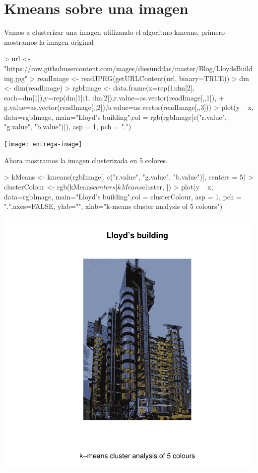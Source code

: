 \documentclass [a4paper] {article}
\begin{document}
\section{Kmeans sobre una imagen}
Vamos a clusterizar una imagen utilizando el algoritmo kmeans, primero mostramos la imagen original
\begin{center}
\begin{Schunk}
\begin{Sinput}
> url <- "https://raw.githubusercontent.com/mages/diesunddas/master/Blog/LloydsBuilding.jpg"
> readImage <- readJPEG(getURLContent(url, binary=TRUE))
> dm <- dim(readImage)
> rgbImage <- data.frame(x=rep(1:dm[2], each=dm[1]),y=rep(dm[1]:1, dm[2]),r.value=as.vector(readImage[,,1]),
+ g.value=as.vector(readImage[,,2]),b.value=as.vector(readImage[,,3]))
> plot(y ~ x, data=rgbImage, main="Lloyd’s building",col = rgb(rgbImage[c("r.value", "g.value", "b.value")]), asp = 1, pch = ".")
\end{Sinput}
\end{Schunk}
\texttt{[image: entrega-image]}
\end{center}
Ahora mostramos la imagen clusterizada en 5 colores.
\begin{center}
\begin{Schunk}
\begin{Sinput}
> kMeans <- kmeans(rgbImage[, c("r.value", "g.value", "b.value")], centers = 5)
> clusterColour <- rgb(kMeans$centers[kMeans$cluster, ])
> plot(y ~ x, data=rgbImage, main="Lloyd’s building",col = clusterColour, asp = 1, pch = ".",axes=FALSE, ylab="", xlab="k-means cluster analysis of 5 colours")
\end{Sinput}
\end{Schunk}
\includegraphics{entrega-image_kmeans}
\end{center}
\end{document}
